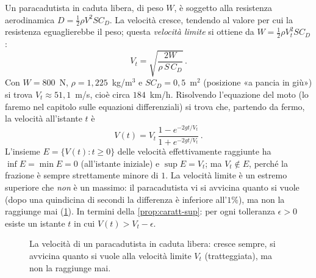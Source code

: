 \begin{esempio}\label{es:velocita-limite}
Un paracadutista in caduta libera, di peso $W$, è soggetto alla resistenza
aerodinamica $D=\tfrac12\rho V^{2}SC_{D}$. La velocità cresce, tendendo al valore per cui
la resistenza eguaglierebbe il peso; questa \emph{velocità limite} si ottiene da $W=\tfrac12\rho V_{t}^{2}SC_{D}$:
\[
  V_{t}=\sqrt{\frac{2W}{\rho\,S\,C_{D}}}\,.
\]
Con $W=800$~N, $\rho=1{,}225$~kg/m$^{3}$ e $SC_{D}=0{,}5$~m$^{2}$ (posizione «a
pancia in giù») si trova $V_{t}\approx51{,}1$~m/s, cioè circa $184$~km/h. Risolvendo l'equazione del moto (lo faremo nel capitolo sulle equazioni
differenziali) si trova che, partendo da fermo, la velocità all'istante $t$ è
\[
  V(t)=V_{t}\,\frac{1-e^{-2gt/V_{t}}}{1+e^{-2gt/V_{t}}}\,.
\]
L'insieme $E=\{V(t): t\ge0\}$ delle velocità effettivamente raggiunte ha
$\inf E=\min E=0$ (all'istante iniziale) e $\sup E=V_{t}$; ma
$V_{t}\notin E$, perché la frazione è sempre strettamente minore di $1$. La
velocità limite è un estremo superiore che \emph{non} è un massimo: il paracadutista vi
si avvicina quanto si vuole (dopo una quindicina di secondi la differenza è inferiore
all'$1\%$), ma non la raggiunge mai (\cref{fig:velocita-limite}). In termini della
\cref{prop:caratt-sup}: per ogni tolleranza $\epsilon>0$ esiste un istante $t$ in cui
$V(t)>V_{t}-\epsilon$.
\end{esempio}

\begin{figure}[htb]
\centering
{}
\caption{La velocità di un paracadutista in caduta libera: cresce sempre, si avvicina
quanto si vuole alla velocità limite $V_{t}$ (tratteggiata), ma non la raggiunge mai.}
\label{fig:velocita-limite}
\end{figure}

